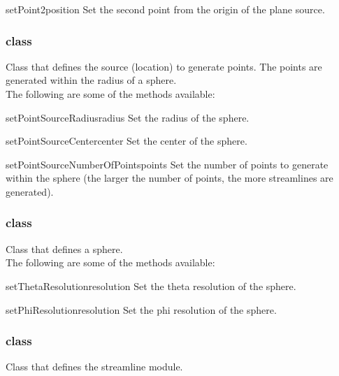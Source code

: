 \begin{methoddesc}[PlaneSource]{setPoint2}{position}
Set the second point from the origin of the plane source.
\end{methoddesc}

\subsubsection{\PointSource class}
Class that defines the source (location) to generate points. The points are
generated within the radius of a sphere. \\

The following are some of the methods available:

\begin{methoddesc}[PointSource]{setPointSourceRadius}{radius}
Set the radius of the sphere.
\end{methoddesc}

\begin{methoddesc}[PointSource]{setPointSourceCenter}{center}
Set the center of the sphere.
\end{methoddesc}

\begin{methoddesc}[PointSource]{setPointSourceNumberOfPoints}{points}
Set the number of points to generate within the sphere (the larger the
number of points, the more streamlines are generated).
\end{methoddesc}

\subsubsection{\Sphere class}
Class that defines a sphere. \\

The following are some of the methods available:

\begin{methoddesc}[Sphere]{setThetaResolution}{resolution}
Set the theta resolution of the sphere.
\end{methoddesc}

\begin{methoddesc}[Sphere]{setPhiResolution}{resolution}
Set the phi resolution of the sphere.
\end{methoddesc}

\subsubsection{\StreamLineModule class}
Class that defines the streamline module. \\

